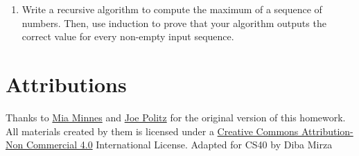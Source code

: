 \documentclass[12pt, oneside]{article}
\begin{document}
\begin{enumerate}
\item Write a recursive algorithm to compute the maximum of a sequence of numbers. Then, use induction to prove that your algorithm outputs the correct value for every non-empty input sequence.


\end{enumerate}

\section*{Attributions}

Thanks to \href{http://cseweb.ucsd.edu/~minnes/}{Mia Minnes} and \href{https://jpolitz.github.io/}{Joe Politz} for the original version of this homework. All materials created by them is licensed under a \href{http://creativecommons.org/licenses/by-nc/4.0/}{Creative Commons Attribution-Non Commercial 4.0} International License. Adapted for CS40 by Diba Mirza
\end{document}
